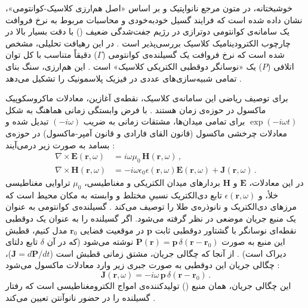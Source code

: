 \documentclass[12pt,a4paper]{report}
\begin{document}
خوشبختانه، در متون مرجع نانواپتیک و بر اساس «اصل هم‌ارزی کلاسیک-کوانتومی»، نشان داده شده است که فرایند گسیل خودبه‌خودی و محاسبات مربوط به نرخ فروافت یک سامانه‌ی کوانتومی دوترازی در رژیم جفت‌شدگی ضعیف () با دقت بسیار بالا در چارچوب الکترودینامیک کلاسیک بررسی‌پذیر است \cite{novotny}. در این رهیافت تحلیلی، مشخص شده است که نرخ فروافت یک گسیلنده‌ی کوانتومی ($\Gamma$) دقیقاً متناسب با کل توان اتلافی ($P$) یک «نوسانگر دوقطبی الکتریکی کلاسیک» است \cite{novotny}. این هم‌ارزی، سنگ بنای تمامی شبیه‌سازی‌های عددی در فیزیک پلاسمونیک را تشکیل می‌دهد \cite{novotny,maier}.

برای توصیف ریاضی این سامانه‌ی کلاسیک، نقطه‌ی آغازین، معادلات ماکروسکوپیک ماکسول در حوزه‌ی زمان هستند \cite{novotny}. با فرض وابستگی زمانی هماهنگ به شکل $\exp(-i\omega t)$ برای تمامی میدان‌ها، مشتقات زمانی به ضریب $(-i\omega)$ تبدیل شده و معادلات چرخشی ماکسول (قانون القای فارادی و قانون آمپر-ماکسول) در حوزه‌ی بسامد به صورت زیر درمی‌آیند \cite{novotny}:
\begin{align}
\nabla\times\mathbf{E}(\mathbf{r},\omega)&=i\omega\mu_0\,\mathbf{H}(\mathbf{r},\omega)\,,\\
\nabla\times\mathbf{H}(\mathbf{r},\omega)&=-i\omega\epsilon_0\epsilon(\mathbf{r},\omega)\mathbf{E}(\mathbf{r},\omega)+\mathbf{J}(\mathbf{r},\omega)\,.
\end{align}
در این معادلات، $\mathbf{E}$ و $\mathbf{H}$ بردارهای میدان الکتریکی و مغناطیسی، $\mu_0$ تراوایی مغناطیسی خلأ، و $\epsilon(\mathbf{r},\omega)$ تابع دی‌الکتریک نسبیِ مختلط و وابسته به مکان محیط است که مرزهای دی‌الکتریک و نانوذره‌ی طلا را توصیف می‌کند \cite{novotny,maier}. گسیلنده‌ی کوانتومی به عنوان یک منبع جریان موضعی در نظر گرفته می‌شود. اگر گسیلنده را به عنوان یک دوقطبی نقطه‌ای نوسانگر با گشتاور دوقطبی ثابت $\mathbf{p}$ در موقعیت فضایی $\mathbf{r}_0$ مدل کنیم، قطبش این منبع به صورت $\mathbf{P}(\mathbf{r})=\mathbf{p}\,\delta(\mathbf{r}-\mathbf{r}_0)$ نوشته می‌شود (که در آن $\delta$ تابع دلتای دیراک است) \cite{novotny}. از آنجا که چگالی جریان، مشتق زمانی قطبش است ($\mathbf{J}=d\mathbf{P}/dt$)، چگالی جریان این دوقطبی به صورت جبری زیر وارد معادلات ماکسول می‌شود \cite{novotny}:
\begin{equation}
\mathbf{J}(\mathbf{r},\omega)=-i\omega\,\mathbf{p}\,\delta(\mathbf{r}-\mathbf{r}_0)\,.
\end{equation}
این چگالی جریان، همان منبع () تولیدکننده‌ی امواج الکترومغناطیسی است که رفتار گسیلنده را در حضور نانوآنتن تعیین می‌کند \cite{novotny}.
\end{document}
